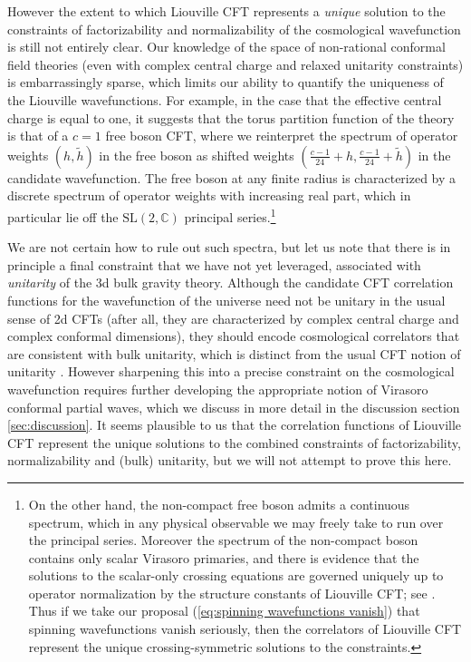 \documentclass[12pt,a4paper]{article}
\newcommand\SL{\text{SL}}
\begin{document}
However the extent to which Liouville CFT represents a \emph{unique} solution to the constraints of factorizability and normalizability of the cosmological wavefunction is still not entirely clear. Our knowledge of the space of non-rational conformal field theories (even with complex central charge and relaxed unitarity constraints) is embarrassingly sparse, which limits our ability to quantify the uniqueness of the Liouville wavefunctions. For example, in the case that the effective central charge is equal to one, it suggests that the torus partition function of the theory is that of a $c=1$ free boson CFT, where we reinterpret the spectrum of operator weights $(h,\tilde h)$ in the free boson as shifted weights $(\tfrac{c-1}{24}+h,\tfrac{c-1}{24}+\tilde h)$ in the candidate wavefunction. The free boson at any finite radius is characterized by a discrete spectrum of operator weights with increasing real part, which in particular lie off the $\SL(2,\mathbb{C})$ principal series.\footnote{On the other hand, the non-compact free boson admits a continuous spectrum, which in any physical observable we may freely take to run over the principal series. Moreover the spectrum of the non-compact boson contains only scalar Virasoro primaries, and there is evidence that the solutions to the scalar-only crossing equations are governed uniquely up to operator normalization by the structure constants of Liouville CFT; see \cite{Ribault:2014hia,Collier:2017shs,Collier:2019weq}. Thus if we take our proposal (\ref{eq:spinning wavefunctions vanish}) that spinning wavefunctions vanish seriously, then the correlators of Liouville CFT represent the unique crossing-symmetric solutions to the constraints.}

We are not certain how to rule out such spectra, but let us note that there is in principle a final constraint that we have not yet leveraged, associated with \emph{unitarity} of the 3d bulk gravity theory. Although the candidate CFT correlation functions for the wavefunction of the universe need not be unitary in the usual sense of 2d CFTs (after all, they are characterized by complex central charge and complex conformal dimensions), they should encode cosmological correlators that are consistent with bulk unitarity, which is distinct from the usual CFT notion of unitarity \cite{Hogervorst:2021uvp,DiPietro:2021sjt}. However sharpening this into a precise constraint on the cosmological wavefunction requires further developing the appropriate notion of Virasoro conformal partial waves, which we discuss in more detail in the discussion section \ref{sec:discussion}. It seems plausible to us that the correlation functions of Liouville CFT represent the unique solutions to the combined constraints of factorizability, normalizability and (bulk) unitarity, but we will not attempt to prove this here.
\end{document}
